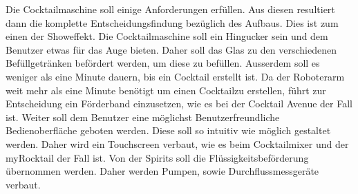 Die Cocktailmaschine soll einige Anforderungen erfüllen. Aus diesen resultiert dann die komplette Entscheidungsfindung bezüglich des Aufbaus. Dies ist zum einen der Showeffekt. Die Cocktailmaschine soll ein Hingucker sein und dem Benutzer etwas für das Auge bieten. Daher soll das Glas zu den verschiedenen Befüllgetränken befördert werden, um diese zu befüllen. Ausserdem soll es weniger als eine Minute dauern, bis ein Cocktail erstellt ist. Da der Roboterarm weit mehr als eine Minute benötigt um einen Cocktailzu erstellen, führt zur Entscheidung ein Förderband einzusetzen, wie es bei der Cocktail Avenue der Fall ist. Weiter soll dem Benutzer eine möglichst Benutzerfreundliche Bedienoberfläche geboten werden. Diese soll so intuitiv wie möglich gestaltet werden. Daher wird ein Touchscreen verbaut, wie es beim Cocktailmixer und der myRocktail der Fall ist. Von der Spirits soll die Flüssigkeitsbeförderung übernommen werden. Daher werden Pumpen, sowie Durchflussmessgeräte verbaut.   